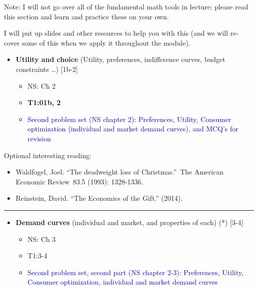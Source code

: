 \documentclass[]{article}
\providecommand{\tightlist}{%
  \setlength{\itemsep}{0pt}\setlength{\parskip}{0pt}}
\begin{document}
Note: I will not go over all of the fundamental math tools in lecture:
please read this section and learn and practice these on your own.

I will put up slides and other resources to help you with this (and we
will re-cover some of this when we apply it throughout the module).

\begin{itemize}
\tightlist
\item
  \textbf{Utility and choice} (Utility, preferences, indifference
  curves, budget constraints \ldots) {[}1b-2{]}

  \begin{itemize}
  \tightlist
  \item
    NS: Ch 2
  \item
    \textbf{T1:01b, 2}
  \item
    \textcolor{blue}{Second problem set (NS chapter 2): Preferences, Utility, Consumer optimization (individual and market demand curves), and MCQ's for revision}
  \end{itemize}
\end{itemize}

Optional interesting reading:

\begin{itemize}
\tightlist
\item
  Waldfogel, Joel. ``The deadweight loss of Christmas.''~The American
  Economic Review~83.5 (1993): 1328-1336.
\item
  Reinstein, David. ``The Economics of the Gift.'' (2014).
\end{itemize}

\begin{center}\rule{0.5\linewidth}{\linethickness}\end{center}

\begin{itemize}
\tightlist
\item
  \textbf{Demand curves} (individual and market, and properties of each)
  (*) {[}3-4{]}

  \begin{itemize}
  \item
    NS: Ch 3
  \item
    T1:3-4
  \item
    \textcolor{blue}{Second problem set, second part (NS chapter 2-3): Preferences, Utility, Consumer optimization, individual and market demand curves}
  \end{itemize}
\end{itemize}
\end{document}
